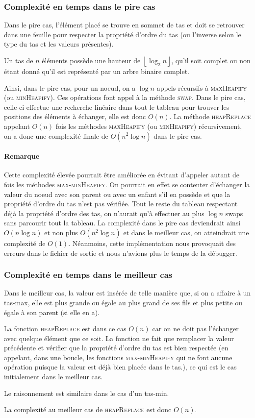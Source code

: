 \documentclass[a4paper, 12pt]{article}
\begin{document}
	\subsubsection{Complexité en temps dans le pire cas}
	Dans le pire cas, l'élément placé se trouve en sommet de tas et doit se retrouver dans une feuille pour respecter la propriété d'ordre du tas (ou l'inverse selon le type du tas et les valeurs présentes).\par
	Un tas de \(n\) éléments possède une hauteur de \(\left\lfloor\log_2 n\right\rfloor\), qu'il soit complet ou non étant donné qu'il est représenté par un arbre binaire complet.\par
	Ainsi, dans le pire cas, pour un noeud, on a \(\log n\) appels récursifs à \textsc{maxHeapify} (ou \textsc{minHeapify}). Ces opérations font appel à la méthode \textsc{swap}. Dans le pire cas, celle-ci effectue une recherche linéaire dans tout le tableau pour trouver les positions des éléments à échanger, elle est donc \(O\left(n\right)\). La méthode \textsc{heapReplace} appelant \(O\left(n\right)\) fois les méthodes \textsc{maxHeapify} (ou \textsc{minHeapify}) récursivement, on a donc une complexité finale de \(O\left(n^2\log n\right)\) dans le pire cas.
	\paragraph{Remarque} Cette complexité élevée pourrait être améliorée en évitant d'appeler autant de fois les méthodes \textsc{max-minHeapify}. On pourrait en effet se contenter d'échanger la valeur du noeud avec son parent ou avec un enfant s'il en possède et que la propriété d'ordre du tas n'est pas vérifiée. Tout le reste du tableau respectant déjà la propriété d'ordre des tas, on n'aurait qu'à effectuer au plus $\log n$ swaps sans parcourir tout la tableau. La complexité dans le pire cas deviendrait ainsi $O(n \log n)$ et non plus $O(n^2\log n)$ et dans le meilleur cas, on atteindrait une complexité de $O(1)$. Néanmoins, cette implémentation nous provoquait des erreurs dans le fichier de sortie et nous n'avions plus le temps de la débugger. 
	\subsubsection{Complexité en temps dans le meilleur cas}
	Dans le meilleur cas, la valeur est insérée de telle manière que, si on a affaire à un tas-max, elle est plus grande ou égale au plus grand de ses fils et plus petite ou égale à son parent (si elle en a).\par
	La fonction \textsc{heapReplace} est dans ce cas \(O\left(n\right)\) car on ne doit pas l'échanger avec quelque élément que ce soit. La fonction ne fait que remplacer la valeur précédente et vérifier que la propriété d'ordre du tas est bien respectée (en appelant, dans une boucle, les fonctions \textsc{max-minHeapify} qui ne font aucune opération puisque la valeur est déjà bien placée dans le tas.), ce qui est le cas initialement dans le meilleur cas.\par
	Le raisonnement est similaire dans le cas d'un tas-min.\par
	La complexité au meilleur cas de \textsc{heapReplace} est donc \(O\left(n\right)\).
\end{document}
